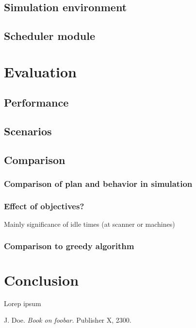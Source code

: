 \documentclass{ctuthesis}
\begin{document}
\section{Simulation environment}
\section{Scheduler module}
\chapter{Evaluation}
\section{Performance}
\section{Scenarios}
\section{Comparison}
\subsection{Comparison of plan and behavior in simulation}
\subsection{Effect of objectives?}
Mainly significance of idle times (at scanner or machines)
\subsection{Comparison to greedy algorithm}
\chapter{Conclusion}

Lorep ipsum \cite{doe}

\begin{thebibliography}{1}

 J. Doe. \emph{Book on foobar.} Publisher X,
 2300.

\end{thebibliography}
\end{document}
